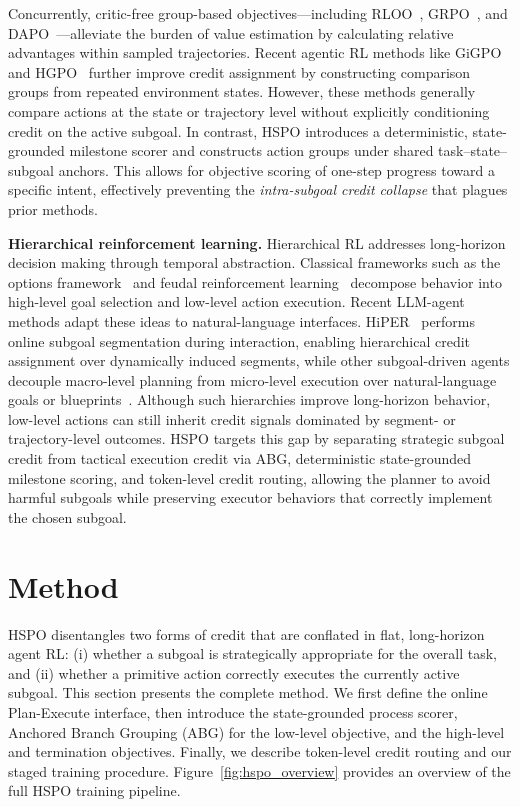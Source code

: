 \documentclass{article}
\newcommand{\wei}[1]{\textcolor{red}{#1}}
\begin{document}
Concurrently, critic-free group-based objectives---including RLOO~\cite{ahmadian2024back}, GRPO~\cite{shao2024deepseekmath}, and DAPO~\cite{yu2025dapo}---alleviate the burden of value estimation by calculating relative advantages within sampled trajectories. Recent agentic RL methods like GiGPO~\cite{NEURIPS2025_420c9f77} and HGPO~\cite{wang2025spa} further improve credit assignment by constructing comparison groups from repeated environment states. However, these methods generally compare actions at the state or trajectory level without explicitly conditioning credit on the active subgoal. In contrast, HSPO introduces a deterministic, state-grounded milestone scorer and constructs action groups under shared task--state--subgoal anchors. This allows for objective scoring of one-step progress toward a specific intent, effectively preventing the \textit{intra-subgoal credit collapse} that plagues prior methods.


\textbf{Hierarchical reinforcement learning.}
Hierarchical RL addresses long-horizon decision making through temporal abstraction. Classical frameworks such as the options framework~\cite{sutton1999between} and feudal reinforcement learning~\cite{vezhnevets2017feudal} decompose behavior into high-level goal selection and low-level action execution. Recent LLM-agent methods adapt these ideas to natural-language interfaces. HiPER~\cite{wang2026subgoal} performs online subgoal segmentation during interaction, enabling hierarchical credit assignment over dynamically induced segments, while other subgoal-driven agents decouple macro-level planning from micro-level execution over natural-language goals or blueprints~\cite{ji2026tree}. Although such hierarchies improve long-horizon behavior, low-level actions can still inherit credit signals dominated by segment- or trajectory-level outcomes. HSPO targets this gap by separating strategic subgoal credit from tactical execution credit via ABG, deterministic state-grounded milestone scoring, and token-level credit routing, allowing the planner to avoid harmful subgoals while preserving executor behaviors that correctly implement the chosen subgoal.


\section{Method}
\label{sec:method}
HSPO disentangles two forms of credit that are conflated in flat, long-horizon agent RL: (i) whether a subgoal is strategically appropriate for the overall task, and (ii) whether a primitive action correctly executes the currently active subgoal. This section presents the complete method. We first define the online Plan-Execute interface, then introduce the state-grounded process scorer, Anchored Branch Grouping (ABG) for the low-level objective, and the high-level and termination objectives. Finally, we describe token-level credit routing and our staged training procedure. Figure~\ref{fig:hspo_overview} provides an overview of the full HSPO training pipeline.%
\end{document}
